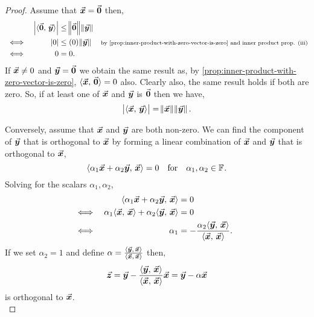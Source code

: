 \documentclass[../MathsNotesBase.tex]{subfiles}
\begin{document}
{	
		\biggerskip
		\begin{proof}\nl[2]			
			Assume that ${ \vec{\bm{x}} = \vec{\bm{0}} }$ then,
			\[\begin{aligned}
				&& \left\lvert\langle \vec{\bm{0}},\, \vec{\bm{y}} \rangle\right\rvert &\leq \norm{\vec{\bm{0}}}\norm{\vec{\bm{y}}} \\
				&\iff & \left\lvert0\right\rvert &\leq (0) \norm{\vec{\bm{y}}} &\text{\scriptsize{by \ref{prop:inner-product-with-zero-vector-is-zero} and inner product prop. (iii)}} \\
				&\iff & 0 &= 0.
			\end{aligned}\]
			If ${ \vec{\bm{x}} \neq 0 }$ and ${ \vec{\bm{y}} = \vec{\bm{0}} }$ we obtain the same result as, by \ref{prop:inner-product-with-zero-vector-is-zero}, ${ \langle \vec{\bm{x}},\, \vec{\bm{0}} \rangle = 0 }$ also. Clearly also, the same result holds if both are zero. So, if at least one of $\vec{\bm{x}}$ and $\vec{\bm{y}}$ is $\vec{\bm{0}}$ then we have,
			\[ \left\lvert\langle \vec{\bm{x}},\, \vec{\bm{y}} \rangle\right\rvert = \norm{\vec{\bm{x}}}\norm{\vec{\bm{y}}}. \]
			
			Conversely, assume that $\vec{\bm{x}}$ and $\vec{\bm{y}}$ are both non-zero. We can find the component of $\vec{\bm{y}}$ that is orthogonal to $\vec{\bm{x}}$ by forming a linear combination of $\vec{\bm{x}}$ and $\vec{\bm{y}}$ that is orthogonal to $\vec{\bm{x}}$,
			\[ \langle \alpha_1 \vec{\bm{x}} + \alpha_2 \vec{\bm{y}},\, \vec{\bm{x}} \rangle = 0 \hspace{10pt}\text{for}\hspace{10pt} \alpha_1,\alpha_2 \in \mathbb{F}^{}. \]
			Solving for the scalars ${ \alpha_1, \alpha_2 }$,
			\[\begin{aligned}
				&& \langle \alpha_1 \vec{\bm{x}} + \alpha_2 \vec{\bm{y}},\, \vec{\bm{x}} \rangle &= 0 \\
				&\iff & \alpha_1 \langle \vec{\bm{x}},\, \vec{\bm{x}} \rangle + \alpha_2 \langle \vec{\bm{y}},\, \vec{\bm{x}} \rangle &= 0 &\text{\scriptsize{}} \\
				&\iff & \alpha_1  &= - \frac{ \alpha_2 \langle \vec{\bm{y}},\, \vec{\bm{x}} \rangle }{ \langle \vec{\bm{x}},\, \vec{\bm{x}} \rangle }. \\
			\end{aligned}\]
			If we set ${ \alpha_2 = 1 }$ and define ${ \alpha = \frac{ \langle \vec{\bm{y}},\, \vec{\bm{x}} \rangle }{ \langle \vec{\bm{x}},\, \vec{\bm{x}} \rangle } }$ then,
			\[ \vec{\bm{z}} = \vec{\bm{y}} - \frac{ \langle \vec{\bm{y}},\, \vec{\bm{x}} \rangle }{ \langle \vec{\bm{x}},\, \vec{\bm{x}} \rangle } \vec{\bm{x}} = \vec{\bm{y}} - \alpha \vec{\bm{x}} \]
			is orthogonal to $\vec{\bm{x}}$.\\
			

\end{proof}}
\end{document}
